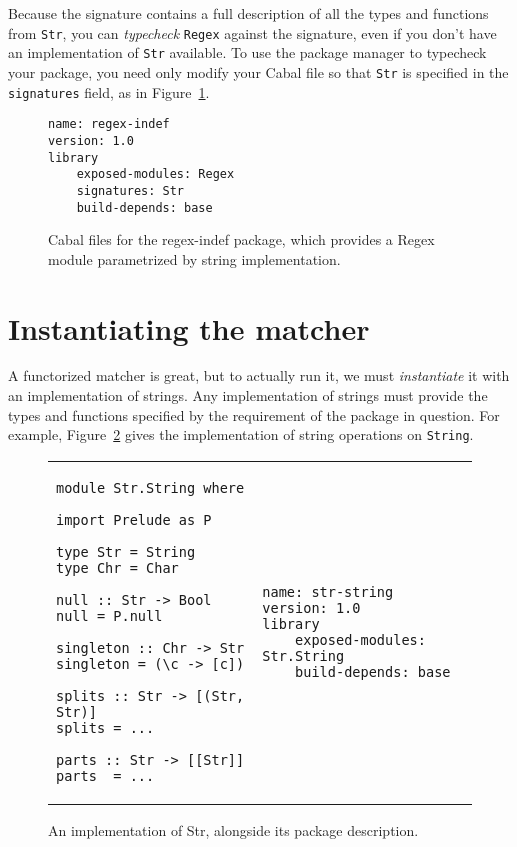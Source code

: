 Because the signature contains a full description of all the types
and functions from \verb|Str|, you can \emph{typecheck} \verb|Regex|
against the signature, even if you don't have an implementation of
\verb|Str| available.  To use the package manager to typecheck
your package, you need only modify your Cabal file so that
\verb|Str| is specified in the \verb|signatures| field, as in
Figure~\ref{fig:matcher-regex-indef-cabal}.

\begin{figure}
\begin{lstlisting}[language=Cabal]
name: regex-indef
version: 1.0
library
    exposed-modules: Regex
    signatures: Str
    build-depends: base
\end{lstlisting}
\caption{Cabal files for the regex-indef package, which provides a Regex
module parametrized by string implementation.}
\label{fig:matcher-regex-indef-cabal}
\end{figure}

\section{Instantiating the matcher}

A functorized matcher is great, but to actually run it, we must
\emph{instantiate} it with an implementation of strings.  Any implementation
of strings must provide the types and functions specified by the requirement
of the package in question. For example, Figure~\ref{fig:matcher-str-string-source}
gives the implementation of string operations on \verb|String|.

\begin{figure}
\begin{tabular}{p{} p{}}
\begin{lstlisting}
module Str.String where

import Prelude as P

type Str = String
type Chr = Char

null :: Str -> Bool
null = P.null

singleton :: Chr -> Str
singleton = (\c -> [c])

splits :: Str -> [(Str, Str)]
splits = ...

parts :: Str -> [[Str]]
parts  = ...
\end{lstlisting}
&
\begin{lstlisting}[language=Cabal]
name: str-string
version: 1.0
library
    exposed-modules: Str.String
    build-depends: base
\end{lstlisting}
\end{tabular}
\caption{An implementation of Str, alongside its package description.}
\label{fig:matcher-str-string-source}
\end{figure}


